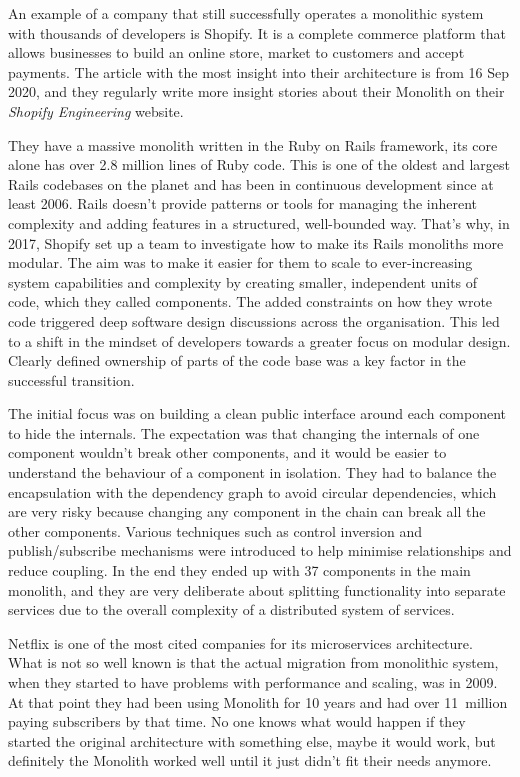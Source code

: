 \begin{example}[Shopify]
    An example of a company that still successfully operates a monolithic system with thousands of developers is Shopify. It is a complete commerce platform that allows businesses to build an online store, market to customers and accept payments. The article\cite{SHOPIFY_MONOLITH_ARTICLE} with the most insight into their architecture is from 16 Sep 2020, and they regularly write more insight stories about their Monolith on their \textit{Shopify Engineering}\cite{SHOPIFY_ENGINEERING} website.

    They have a massive monolith written in the Ruby on Rails framework, its core alone has over 2.8 million lines of Ruby code. This is one of the oldest and largest Rails codebases on the planet and has been in continuous development since at least 2006. Rails doesn't provide patterns or tools for managing the inherent complexity and adding features in a structured, well-bounded way. That's why, in 2017, Shopify set up a team to investigate how to make its Rails monoliths more modular. The aim was to make it easier for them to scale to ever-increasing system capabilities and complexity by creating smaller, independent units of code, which they called components. The added constraints on how they wrote code triggered deep software design discussions across the organisation. This led to a shift in the mindset of developers towards a greater focus on modular design. Clearly defined ownership of parts of the code base was a key factor in the successful transition. \cite{SHOPIFY_MONOLITH_ARTICLE}

    The initial focus was on building a clean public interface around each component to hide the internals. The expectation was that changing the internals of one component wouldn't break other components, and it would be easier to understand the behaviour of a component in isolation. They had to balance the encapsulation with the dependency graph to avoid circular dependencies, which are very risky because changing any component in the chain can break all the other components. Various techniques such as control inversion and publish/subscribe mechanisms were introduced to help minimise relationships and reduce coupling. In the end they ended up with 37 components in the main monolith, and they are very deliberate about splitting functionality into separate services due to the overall complexity of a distributed system of services. \cite{SHOPIFY_MONOLITH_ARTICLE}
\end{example}

\begin{note*}
    Netflix is one of the most cited companies for its microservices architecture. What is not so well known is that the actual migration from monolithic system, when they started to have problems with performance and scaling, was in 2009. At that point they had been using Monolith for 10 years and had over 11~million \cite{NETFLIX_2009_EARNINGS} paying subscribers by that time. No one knows what would happen if they started the original architecture with something else, maybe it would work, but definitely the Monolith worked well until it just didn't fit their needs anymore.
\end{note*}
